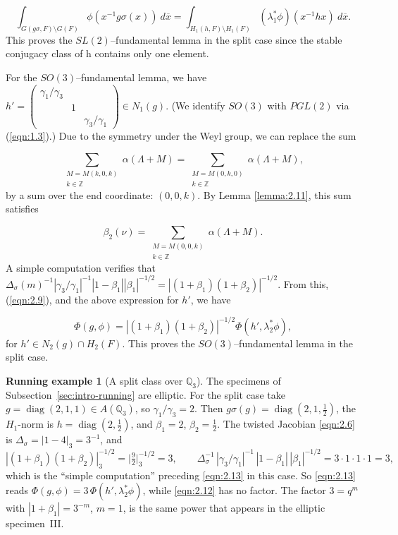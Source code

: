 \documentclass[12pt,letterpaper]{amsart}
\numberwithin{equation}{section}
\theoremstyle{definition}
\newtheorem{runex}[theorem]{Running example}
\theoremstyle{plain}
\def\zzz{\mathbb{Z}}
\def\ovx{\overline{x}}
\begin{document}
\begin{equation}
\label{eqn:2.12}
 \int_{G(g\sigma ,F)\setminus G(F)} \phi (x^{-1}g\sigma (x))\ d\ovx
 =\int_{H_1(h,F)\setminus H_1(F)}
(\lambda_1^*\phi )(x^{-1}hx)\ d\ovx .
\end{equation}
This proves the $SL(2)$--fundamental lemma
in the split case since the stable conjugacy class of h contains only
one element.
 
For the $SO(3)$--fundamental lemma, we have $h' = \left(
\begin{array}{ccc}  \gamma_1/\gamma_3&\ &\ \\
 \ &1&\ \\
 \ &\ &\gamma_3/\gamma_1\end{array}\right) \in N_1(g)$.
(We identify $SO(3)$ with $PGL(2)$ via (\ref{eqn:1.3}).)
Due to the symmetry under the Weyl group, we can replace the sum

\[
\sum_{\substack{M=M(k,0,k)\\k\in \zzz }}
\alpha (\Lambda +M)
=\sum_{\substack{ M=M(0,k,0)\\k\in \zzz }}
\alpha (\Lambda +M),
\]
by a sum over the end coordinate: $(0,0,k)$. By Lemma \ref{lemma:2.11}, 
this sum satisfies

\[
\beta_2 (\nu )=
\sum_{\substack{M=M(0,0,k)\\k\in \zzz }}
\alpha (\Lambda +M).
\]
A simple computation verifies that $\Delta_{\sigma }(m)^{-1}
|\gamma_3/\gamma_1|^{-1}|1-\beta_1||\beta_1|^{-1/2}
=|(1+\beta_1)(1+\beta_2)|^{-1/2}.$
From this, (\ref{eqn:2.9}), and the above expression for $h'$, we have

\begin{equation}
\label{eqn:2.13}
\Phi (g,\phi )=|(1+\beta_1)(1+\beta_2)|^{-1/2}
\Phi (h',\lambda_2^*\phi ),
\end{equation}
for $h'\in N_2(g)\cap H_2(F)$. This proves the $SO(3)$--fundamental
lemma in the split case.
\begin{runex}[A split class over $\mathbb Q_3$]
\label{run:split}
The specimens of Subsection~\ref{sec:intro-running} are elliptic. For
the split case take $g=\operatorname{diag}(2,1,1)\in A(\mathbb Q_3)$,
so $\gamma_1/\gamma_3=2$. Then
$g\sigma(g)=\operatorname{diag}(2,1,\tfrac12)$, the $H_1$-norm is
$h=\operatorname{diag}(2,\tfrac12)$, and $\beta_1=2$,
$\beta_2=\tfrac12$. The twisted Jacobian \eqref{eqn:2.6} is
$\Delta_\sigma=|1-4|_3=3^{-1}$, and
\[
 |(1+\beta_1)(1+\beta_2)|_3^{-1/2}=\bigl|\tfrac92\bigr|_3^{-1/2}=3,
 \qquad
 \Delta_\sigma^{-1}\,|\gamma_3/\gamma_1|^{-1}\,|1-\beta_1|\,|\beta_1|^{-1/2}
 =3\cdot1\cdot1\cdot1=3,
\]
which is the ``simple computation'' preceding \eqref{eqn:2.13} in
this case. So \eqref{eqn:2.13} reads
$\Phi(g,\phi)=3\,\Phi(h',\lambda_2^*\phi)$, while \eqref{eqn:2.12} has
no factor. The factor $3=q^m$ with $|1+\beta_1|=3^{-m}$, $m=1$, is the
same power that appears in the elliptic specimen~III.
\end{runex}
\end{document}
